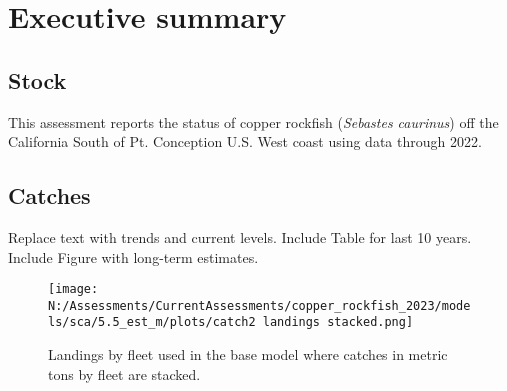 \documentclass[11pt,
  english,
  letterpaper,
]{article}
\begin{document}
\pagestyle{plain}  %
\renewcommand*{\thefootnote}{\arabic{footnote}}  %
\setcounter{footnote}{0}  %
\renewcommand{\headrulewidth}{0.5pt}
\renewcommand{\footrulewidth}{0.5pt}

\newcommand{\lt}{\ensuremath <}
\newcommand{\gt}{\ensuremath >}

\pagebreak
{}
\setcounter{page}{1}

\renewcommand{\thetable}{\roman{table}}
\renewcommand{\thefigure}{\roman{figure}}

\setlength\parskip{0.5em plus 0.1em minus 0.2em}

\hypertarget{executive-summary}{%
\section*{Executive summary}\label{executive-summary}}

\hypertarget{stock}{%
\subsection*{Stock}\label{stock}}

This assessment reports the status of copper rockfish (\emph{Sebastes caurinus}) off the California South of Pt. Conception U.S. West coast using data through 2022.

\hypertarget{catches}{%
\subsection*{Catches}\label{catches}}

Replace text with trends and current levels. Include Table for last 10 years. Include Figure with long-term estimates.



\begin{figure}
\centering
\texttt{[image: N:/Assessments/CurrentAssessments/copper\_rockfish\_2023/models/sca/5.5\_est\_m/plots/catch2 landings stacked.png]}
\caption{Landings by fleet used in the base model where catches in metric tons by fleet are stacked.\label{fig:es-catch}}
\end{figure}
\end{document}
